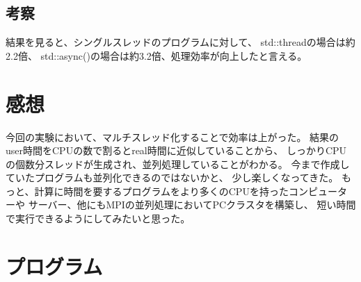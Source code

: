\documentclass[a4j]{jarticle}
\begin{document}
\subsection{考察}
結果を見ると、シングルスレッドのプログラムに対して、
std::threadの場合は約2.2倍、
std::async()の場合は約3.2倍、処理効率が向上したと言える。

\section{感想}
今回の実験において、マルチスレッド化することで効率は上がった。
結果のuser時間をCPUの数で割るとreal時間に近似していることから、
しっかりCPUの個数分スレッドが生成され、並列処理していることがわかる。
今まで作成していたプログラムも並列化できるのではないかと、
少し楽しくなってきた。
もっと、計算に時間を要するプログラムをより多くのCPUを持ったコンピューターや
サーバー、他にもMPIの並列処理においてPCクラスタを構築し、
短い時間で実行できるようにしてみたいと思った。

\section{プログラム}






\end{document}
